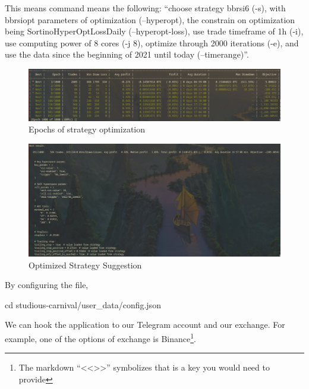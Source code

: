 \documentclass[
12pt,				%
openright,			%
oneside,			%
a4paper,			%
brazil,				%
english,			%
]{abntex2}
\begin{document}
This means command means the following: ``choose strategy bbrsi6 (-s), with bbrsiopt parameters of optimization (--hyperopt), the constrain on optimization being SortinoHyperOptLossDaily (--hyperopt-loss), use trade timeframe of 1h (-i), use computing power of 8 cores (-j 8), optimize through 2000 iterations (-e), and use the data since the beginning of 2021 until today (--timerange)''.

\begin{figure}[ht]
  \centering
    \caption{\label{fig:freqtrade-running} Epochs of strategy optimization}
  \includegraphics[width=\linewidth]{Imagens/freqtrade2.jpeg}
\end{figure}
\begin{figure}[ht]
  \centering
    \caption{\label{fig:freqtrade-running} Optimized Strategy Suggestion}
  \includegraphics[width=\linewidth]{Imagens/freqtrade3.jpeg}
\end{figure}

By configuring the file,
\begin{shell}
cd studious-carnival/user_data/config.json
\end{shell}

We can hook the application to our Telegram account and our exchange. For example, one of the options of exchange is Binance\footnote{The markdown ``<<>>'' symbolizes that is a key you would need to provide}.
\end{document}
